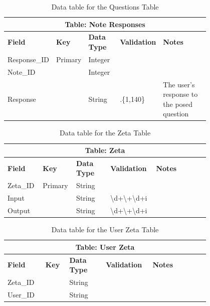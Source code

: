 \documentclass{article}
\begin{document}
\begin{table}[ht]
    \centering
    \begin{tabular}{ | p{0.15\linewidth} | p{0.1\linewidth} | p{0.16\linewidth} | p{0.14\linewidth} | p{0.25\linewidth} | }
    \hline
    \multicolumn{5}{|c|}{\textbf{Table: Note Responses}}\\
    \hline
    \hline
    \textbf{Field} & \textbf{Key} & \textbf{Data Type} & \textbf{Validation} & \textbf{Notes} \\
    \hline
    Response\_ID & Primary & Integer & & \\
    \hline
    Note\_ID & & Integer & & \\
    \hline
    Response & & String & .\{1,140\} & The user's response to the posed question\\
    \hline
    \end{tabular}
    \caption{Data table for the Questions Table}
\end{table}

\begin{table}[ht]
    \centering
    \begin{tabular}{ | p{0.12\linewidth} | p{0.1\linewidth} | p{0.16\linewidth} | p{0.17\linewidth} | p{0.25\linewidth} | }
    \hline
    \multicolumn{5}{|c|}{\textbf{Table: Zeta}}\\
    \hline
    \hline
    \textbf{Field} & \textbf{Key} & \textbf{Data Type} & \textbf{Validation} & \textbf{Notes} \\
    \hline
    Zeta\_ID & Primary & String & & \\
    \hline
    Input & & String & \textbackslash d+\textbackslash +\textbackslash d+i & \\
    \hline
    Output & & String & \textbackslash d+\textbackslash +\textbackslash d+i & \\
    \hline
    \end{tabular}
    \caption{Data table for the Zeta Table}
\end{table}

\begin{table}[ht]
    \centering
    \begin{tabular}{ | p{0.15\linewidth} | p{0.1\linewidth} | p{0.16\linewidth} | p{0.14\linewidth} | p{0.25\linewidth} | }
    \hline
    \multicolumn{5}{|c|}{\textbf{Table: User Zeta}}\\
    \hline
    \hline
    \textbf{Field} & \textbf{Key} & \textbf{Data Type} & \textbf{Validation} & \textbf{Notes} \\
    \hline
    Zeta\_ID & & String & & \\
    \hline
    User\_ID & & String & & \\
    \hline
    \end{tabular}
    \caption{Data table for the User Zeta Table}
\end{table}
\end{document}
